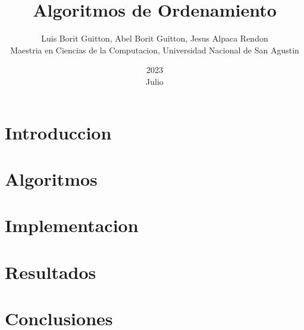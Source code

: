 \documentclass{article} %
\title{Algoritmos de Ordenamiento}
\date{2023\\ Julio}
\author{Luis Borit Guitton, Abel Borit Guitton, Jesus Alpaca Rendon\\ Maestria en Ciencias de la Computacion, Universidad Nacional de San Agustin}
\begin{document}
\maketitle
\section{Introduccion}
\section{Algoritmos}
\section{Implementacion}
\section{Resultados}
\section{Conclusiones}
\end{document}
